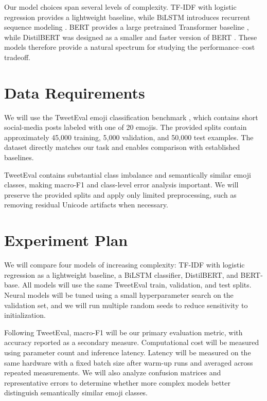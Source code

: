 \documentclass[12pt]{extarticle}
\begin{document}
Our model choices span several levels of complexity. TF-IDF with logistic
regression provides a lightweight baseline, while BiLSTM introduces recurrent
sequence modeling \cite{hochreiter1997lstm,schuster1997brnn}. BERT provides a
large pretrained Transformer baseline \cite{devlin2019bert}, while DistilBERT
was designed as a smaller and faster version of BERT \cite{sanh2019distilbert}.
These models therefore provide a natural spectrum for studying the
performance--cost tradeoff.

\section{Data Requirements}

We will use the TweetEval emoji classification benchmark
\cite{barbieri2020tweeteval}, which contains short social-media posts labeled with one
of 20 emojis. The provided splits contain approximately 45,000 training, 5,000
validation, and 50,000 test examples. The dataset directly matches our task and enables
comparison with established baselines.

TweetEval contains substantial class imbalance and semantically similar emoji classes,
making macro-F1 and class-level error analysis important. We will preserve the provided
splits and apply only limited preprocessing, such as removing residual Unicode artifacts
when necessary.

\section{Experiment Plan}

We will compare four models of increasing complexity: TF-IDF with logistic
regression as a lightweight baseline, a BiLSTM classifier, DistilBERT, and
BERT-base. All models will use the same TweetEval train, validation, and test
splits. Neural models will be tuned using a small hyperparameter search on the
validation set, and we will run multiple random seeds to reduce sensitivity to
initialization.

Following TweetEval, macro-F1 will be our primary evaluation metric, with
accuracy reported as a secondary measure. Computational cost will be measured
using parameter count and inference latency. Latency will be measured on the
same hardware with a fixed batch size after warm-up runs and averaged across
repeated measurements. We will also analyze confusion matrices and
representative errors to determine whether more complex models better
distinguish semantically similar emoji classes.
\end{document}
